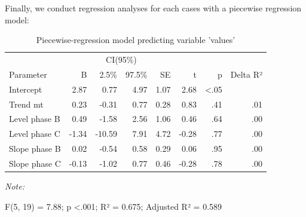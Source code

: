 \documentclass[
]{book}
\newenvironment{Shaded}{\begin{snugshade}}{\end{snugshade}}
\newcommand{\FunctionTok}[1]{\textcolor[rgb]{0.00,0.00,0.00}{#1}}
\newcommand{\NormalTok}[1]{#1}
\newcommand{\SpecialCharTok}[1]{\textcolor[rgb]{0.00,0.00,0.00}{#1}}
\begin{document}
Finally, we conduct regression analyses for each cases with a piecewise regression model:

\begin{Shaded}
\end{Shaded}

\begin{table}[!h]

\caption{\label{tab:plm-strange-study}Piecewise-regression model predicting variable 'values'}
\begin{threeparttable}
\begin{tabular}[t]{lrrrrrrr}
\toprule
\multicolumn{2}{c}{ } & \multicolumn{2}{c}{CI(95\%)} & \multicolumn{4}{c}{ } \\
\cmidrule(l{3pt}r{3pt}){3-4}
Parameter & B & 2.5\% & 97.5\% & SE & t & p & Delta R²\\
\midrule
Intercept & 2.87 & 0.77 & 4.97 & 1.07 & 2.68 & <.05 & \\
Trend mt & 0.23 & -0.31 & 0.77 & 0.28 & 0.83 & .41 & .01\\
Level phase B & 0.49 & -1.58 & 2.56 & 1.06 & 0.46 & .64 & .00\\
Level phase C & -1.34 & -10.59 & 7.91 & 4.72 & -0.28 & .77 & .00\\
Slope phase B & 0.02 & -0.54 & 0.58 & 0.29 & 0.06 & .95 & .00\\
Slope phase C & -0.13 & -1.02 & 0.77 & 0.46 & -0.28 & .78 & .00\\
\bottomrule
\end{tabular}
\begin{tablenotes}
\item \textit{Note: } 
\item F(5, 19) = 7.88; p <.001; R² = 0.675; Adjusted R² = 0.589
\end{tablenotes}
\end{threeparttable}
\end{table}
\end{document}

